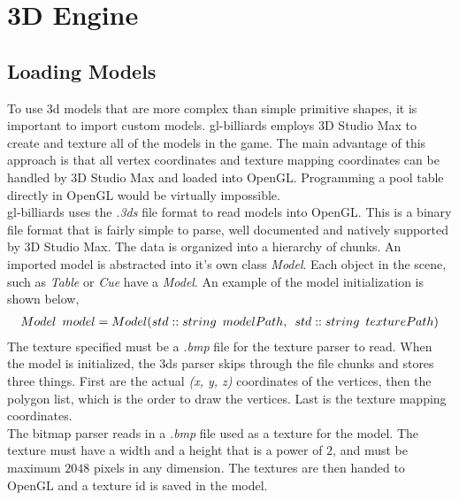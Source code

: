 
\section{3D Engine}
	\subsection{Loading Models}
	To use 3d models that are more complex than simple primitive shapes, it is important to import custom models. gl-billiards employs 3D Studio Max
    to create and texture all of the models in the game. The main advantage of this approach is that all vertex coordinates and texture mapping 
    coordinates can be handled by 3D Studio Max and loaded into OpenGL. Programming a pool table directly in OpenGL would be virtually impossible.
    \\
	gl-billiards uses the \textit{.3ds} file format to read models into OpenGL. This is a binary file format that is fairly simple to parse,
    well documented and natively supported by 3D Studio Max. The data is organized into a hierarchy of chunks. An imported model is
    abstracted into it's own class \textit{Model}. Each object in the scene, such as \textit{Table} or \textit{Cue} have a \textit{Model}.
    An example of the model initialization is shown below,
	\begin{eqnarray}
        Model{\enskip}model = Model(std::string{\enskip}modelPath,{\enskip}std::string{\enskip}texturePath) \nonumber
	\end{eqnarray}
    The texture specified must be a \textit{.bmp} file for the texture parser to read. When the model is initialized, the 3ds parser skips
    through the file chunks and stores three things. First are the actual \textit{(x, y, z)} coordinates of the vertices, then the polygon list,
    which is the order to draw the vertices. Last is the texture mapping coordinates.
    \\
    The bitmap parser reads in a \textit{.bmp} file used as a texture for the model. The texture must have a width and a height that is a power of $2$, 
    and must be maximum $2048$ pixels in any dimension. The textures are then handed to OpenGL and a texture id is saved in the model.

